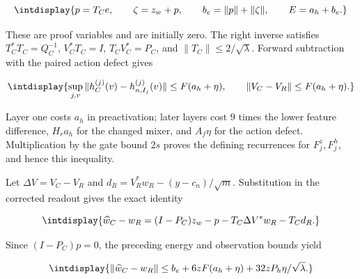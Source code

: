 \begingroup\renewcommand{\theHequation}{intdisplay.588}
\begin{equation*}
\intdisplay{
p=T_Ce,\qquad \zeta=z_w+p,\qquad
b_e=\|p\|+\|\zeta\|,\qquad E=a_h+b_e.
}
\end{equation*}
\endgroup


These are proof variables and are initially zero. The right inverse satisfies \(T_C^*T_C=Q_C^{-1}\), \(V_C^*T_C=I\), \(T_CV_C^*=P_C\), and \(\|T_C\|\le2/\sqrt\lambda\). Forward subtraction with the paired action defect gives


\begingroup\renewcommand{\theHequation}{intdisplay.589}
\begin{equation}
\intdisplay{
\sup_{j,v}\|h_C^{(j)}(v)-h_{n,I_j}^{(j)}(v)\|\le F(a_h+\eta),
\qquad \|V_C-V_R\|\le F(a_h+\eta).
}
\label{int:eq-0248-harmonic-forward-difference}
\end{equation}
\endgroup


Layer one costs \(a_h\) in preactivation; later layers cost \(9\) times the lower feature difference, \(H_ra_h\) for the changed mixer, and \(A_f\eta\) for the action defect. Multiplication by the gate bound \(2s\) proves the defining recurrences for \(F_j^z,\allowbreak F_j^h\), and hence this inequality.



Let \(\Delta V=V_C-V_R\) and \(d_R=V_R^*w_R-(y-c_n)/\sqrt m\). Substitution in the corrected readout gives the exact identity


\begingroup\renewcommand{\theHequation}{intdisplay.590}
\begin{equation*}
\intdisplay{
\widehat w_C-w_R=(I-P_C)z_w-p-T_C\Delta V^*w_R-T_Cd_R.
}
\end{equation*}
\endgroup


Since \((I-P_C)p=0\), the preceding energy and observation bounds yield


\begingroup\renewcommand{\theHequation}{intdisplay.591}
\begin{equation}
\intdisplay{
\|\widehat w_C-w_R\|
       \le b_e+6zF(a_h+\eta)+32zP_h\eta/\sqrt\lambda.
}
\label{int:eq-0249-harmonic-effective-readout-difference}
\end{equation}
\endgroup


